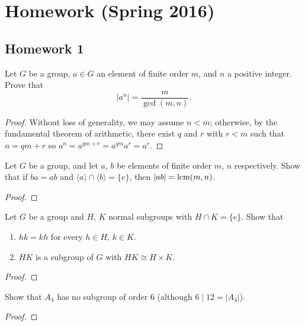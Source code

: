 \chapter{Homework (Spring 2016)}
\section{Homework 1}
\begin{problem}
Let $G$ be a group, $a\in G$ an element of finite order $m$, and $n$ a
positive integer. Prove that
\[
|a^n|=\frac{m}{\gcd(m,n)}.
\]
\end{problem}
\begin{proof}
Without loss of generality, we may assume $n<m$; otherwise, by the
fundamental theorem of arithmetic, there exist $q$ and $r$ with $r<m$ such
that $n=qm+r$ so $a^n=a^{qm+r}=a^{qm}a^r=a^r$.
\end{proof}

\begin{problem}
Let $G$ be a group, and let $a$, $b$ be elements of finite order $m$, $n$
respectively. Show that if $ba=ab$ and $\langle a\rangle\cap\langle
b\rangle=\{e\}$, then $|ab|=\operatorname{lcm}(m,n)$.
\end{problem}
\begin{proof}
\end{proof}

\begin{problem}
Let $G$ be a group and $H$, $K$ normal subgroups with $H\cap K=\{e\}$. Show
that
\begin{enumerate}[label=(\alph*)]
\item $hk=kh$ for every $h\in H$, $k\in K$.
\item $HK$ is a subgroup of $G$ with $HK\cong H\times K$.
\end{enumerate}
\end{problem}
\begin{proof}
\end{proof}

\begin{problem}
Show that $A_4$ has no subgroup of order $6$ (although $6\mid 12=|A_4|$).
\end{problem}
\begin{proof}
\end{proof}

